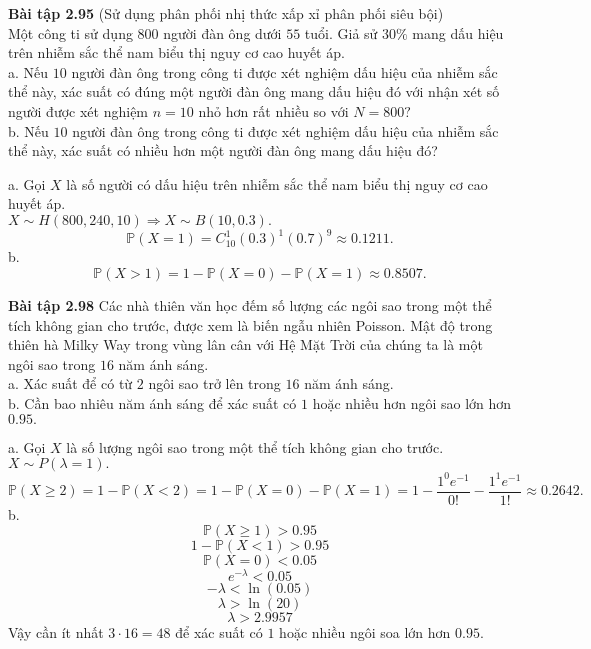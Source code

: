 \documentclass[12pt,a4paper]{article}
\begin{document}
\begin{mybox}
\textbf{Bài tập 2.95} (Sử dụng phân phối nhị thức xấp xỉ phân phối siêu bội)\\
Một công ti sử dụng $800$ người đàn ông dưới $55$ tuổi. Giả sử $30 \%$ mang dấu hiệu trên nhiễm sắc thể nam biểu thị nguy cơ cao huyết áp.\\
a. Nếu $10$ người đàn ông trong công ti được xét nghiệm dấu hiệu của nhiễm sắc thể này, xác suất có đúng một người đàn ông mang dấu hiệu đó với nhận xét số người được xét nghiệm $n = 10$ nhỏ hơn rất nhiều so với $N = 800?$\\
b. Nếu $10$ người đàn ông trong công ti được xét nghiệm dấu hiệu của nhiễm sắc thể này, xác suất có nhiều hơn một người đàn ông mang dấu hiệu đó?
\end{mybox}
a. Gọi $X$ là số người có dấu hiệu trên nhiễm sắc thể nam biểu thị nguy cơ cao huyết áp.\\
$X \sim H \left( {800, 240, 10} \right) \Rightarrow X \sim B \left( {10, 0.3} \right).$\\
$$\mathbb{P} \left( {X = 1} \right) = C^1_{10} \left( {0.3} \right)^1 \left( {0.7} \right)^9 \approx 0.1211.$$
b. $$\mathbb{P} \left( {X > 1} \right) = 1 - \mathbb{P} \left( {X = 0} \right) - \mathbb{P} \left( {X = 1} \right) \approx 0.8507.$$

\begin{mybox}
\textbf{Bài tập 2.98} Các nhà thiên văn học đếm số lượng các ngôi sao trong một thể tích không gian cho trước, được xem là biến ngẫu nhiên Poisson. Mật độ trong thiên hà Milky Way trong vùng lân cân với Hệ Mặt Trời của chúng ta là một ngôi sao trong $16$ năm ánh sáng.\\
a. Xác suất để có từ $2$ ngôi sao trở lên trong $16$ năm ánh sáng.\\
b. Cần bao nhiêu năm ánh sáng để xác suất có $1$ hoặc nhiều hơn ngôi sao lớn hơn $0.95.$
\end{mybox}
a. Gọi $X$ là số lượng ngôi sao trong một thể tích không gian cho trước.\\
$X \sim P \left( {\lambda = 1} \right).$\\
$$\mathbb{P} \left( {X \geqslant 2} \right) = 1 - \mathbb{P} \left( {X < 2} \right) = 1 -  \mathbb{P} \left( {X = 0} \right) - \mathbb{P} \left( {X = 1} \right) = 1 - \frac{{{1^0}{e^{ - 1}}}}{{0!}} - \frac{{{1^1}{e^{ - 1}}}}{{1!}} \approx 0.2642.$$
b. $$\mathbb{P} \left( {X \geqslant 1} \right) > 0.95$$
$$1 - \mathbb{P} \left( {X < 1} \right) > 0.95$$
$$\mathbb{P} \left( {X = 0} \right) < 0.05$$
$$e^{- \lambda } < 0.05$$
$$ - \lambda < \ln \left( {0.05} \right)$$
$$ \lambda > \ln \left( {20} \right)$$
$$ \lambda > 2.9957$$
Vậy cần ít nhất $3 \cdot 16 = 48$ để xác suất có $1$ hoặc nhiều ngôi soa lớn hơn $0.95.$
\end{document}
